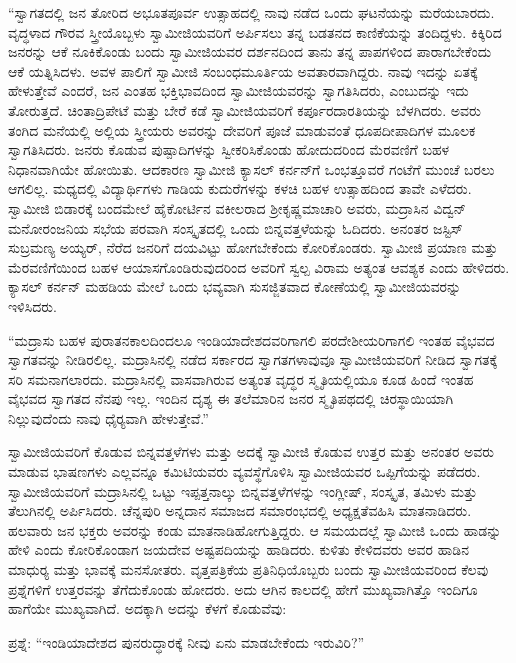  “ಸ್ವಾಗತದಲ್ಲಿ ಜನ ತೋರಿದ ಅಭೂತಪೂರ್ವ ಉತ್ಸಾಹದಲ್ಲಿ ನಾವು ನಡೆದ ಒಂದು ಘಟನೆಯನ್ನು ಮರೆಯಬಾರದು. ವೃದ್ಧಳಾದ ಗೌರವ ಸ್ತ್ರೀಯೊಬ್ಬಳು ಸ್ವಾಮೀಜಿಯವರಿಗೆ ಅರ್ಪಿಸಲು ತನ್ನ ಬಡತನದ ಕಾಣಿಕೆಯನ್ನು ತಂದಿದ್ದಳು. ಕಿಕ್ಕಿರಿದ ಜನರನ್ನು ಆಕೆ ನೂಕಿಕೊಂಡು ಬಂದು ಸ್ವಾಮೀಜಿಯವರ ದರ್ಶನದಿಂದ ತಾನು ತನ್ನ ಪಾಪಗಳಿಂದ ಪಾರಾಗಬೇಕೆಂದು ಆಕೆ ಯತ್ನಿಸಿದಳು. ಅವಳ ಪಾಲಿಗೆ ಸ್ವಾಮೀಜಿ ಸಂಬಂಧಮೂರ್ತಿಯ ಅವತಾರವಾಗಿದ್ದರು. ನಾವು ಇದನ್ನು ಏತಕ್ಕೆ ಹೇಳುತ್ತೇವೆ ಎಂದರೆ, ಜನ ಎಂತಹ ಭಕ್ತಿಭಾವದಿಂದ ಸ್ವಾಮೀಜಿಯವರನ್ನು ಸ್ವಾಗತಿಸಿದರು, ಎಂಬುದನ್ನು ಇದು ತೋರುತ್ತದೆ. ಚಿಂತಾದ್ರಿಪೇಟೆ ಮತ್ತು ಬೇರೆ ಕಡೆ ಸ್ವಾಮೀಜಿಯವರಿಗೆ ಕರ್ಪೂರದಾರತಿಯನ್ನು ಬೆಳಗಿದರು. ಅವರು ತಂಗಿದ ಮನೆಯಲ್ಲಿ ಅಲ್ಲಿಯ ಸ್ತ್ರೀಯರು ಅವರನ್ನು ದೇವರಿಗೆ ಪೂಜೆ ಮಾಡುವಂತೆ ಧೂಪದೀಪಾದಿಗಳ ಮೂಲಕ ಸ್ವಾಗತಿಸಿದರು. ಜನರು ಕೊಡುವ ಪುಷ್ಪಾದಿಗಳನ್ನು ಸ್ವೀಕರಿಸಿಕೊಂಡು ಹೋದುದರಿಂದ ಮೆರವಣಿಗೆ ಬಹಳ ನಿಧಾನವಾಗಿಯೇ ಹೋಯಿತು. ಆದಕಾರಣ ಸ್ವಾಮೀಜಿ ಕ್ಯಾಸಲ್ ಕರ್ನನ್‍ಗೆ ಒಂಭತ್ತೂವರೆ ಗಂಟೆಗೆ ಮುಂಚೆ ಬರಲು ಆಗಲಿಲ್ಲ. ಮಧ್ಯದಲ್ಲಿ ವಿದ್ಯಾರ್ಥಿಗಳು ಗಾಡಿಯ ಕುದುರೆಗಳನ್ನು ಕಳಚಿ ಬಹಳ ಉತ್ಸಾಹದಿಂದ ತಾವೇ ಎಳೆದರು. ಸ್ವಾಮೀಜಿ ಬಿಡಾರಕ್ಕೆ ಬಂದಮೇಲೆ ಹೈಕೋರ್ಟಿನ ವಕೀಲರಾದ ಶ‍್ರೀಕೃಷ್ಣಮಾಚಾರಿ ಅವರು, ಮದ್ರಾಸಿನ ವಿದ್ವನ್ ಮನೋರಂಜನಿಯ ಸಭೆಯ ಪರವಾಗಿ ಸಂಸ್ಕೃತದಲ್ಲಿ ಒಂದು ಬಿನ್ನವತ್ತಳೆಯನ್ನು ಓದಿದರು. ಅನಂತರ ಜಸ್ಟಿಸ್ ಸುಬ್ರಮಣ್ಯ ಅಯ್ಯರ್, ನೆರೆದ ಜನರಿಗೆ ದಯವಿಟ್ಟು ಹೋಗಬೇಕೆಂದು ಕೋರಿಕೊಂಡರು. ಸ್ವಾಮೀಜಿ ಪ್ರಯಾಣ ಮತ್ತು ಮೆರವಣಿಗೆಯಿಂದ ಬಹಳ ಆಯಾಸಗೊಂಡಿರುವುದರಿಂದ ಅವರಿಗೆ ಸ್ವಲ್ಪ ವಿರಾಮ ಅತ್ಯಂತ ಆವಶ್ಯಕ ಎಂದು ಹೇಳಿದರು. ಕ್ಯಾಸಲ್ ಕರ್ನನ್ ಮಹಡಿಯ ಮೇಲೆ ಒಂದು ಭವ್ಯವಾಗಿ ಸುಸಜ್ಜಿತವಾದ ಕೋಣೆಯಲ್ಲಿ ಸ್ವಾಮೀಜಿಯವರನ್ನು ಇಳಿಸಿದರು. 

 “ಮದ್ರಾಸು ಬಹಳ ಪುರಾತನಕಾಲದಿಂದಲೂ ಇಂಡಿಯಾದೇಶದವರಿಗಾಗಲಿ ಪರದೇಶೀಯರಿಗಾಗಲಿ ಇಂತಹ ವೈಭವದ ಸ್ವಾಗತವನ್ನು ನೀಡಿರಲಿಲ್ಲ. ಮದ್ರಾಸಿನಲ್ಲಿ ನಡೆದ ಸರ್ಕಾರದ ಸ್ವಾಗತಗಳಾವುವೂ ಸ್ವಾಮೀಜಿಯವರಿಗೆ ನೀಡಿದ ಸ್ವಾಗತಕ್ಕೆ ಸರಿ ಸಮನಾಗಲಾರದು. ಮದ್ರಾಸಿನಲ್ಲಿ ವಾಸವಾಗಿರುವ ಅತ್ಯಂತ ವೃದ್ಧರ ಸ್ಮೃತಿಯಲ್ಲಿಯೂ ಕೂಡ ಹಿಂದೆ ಇಂತಹ ವೈಭವದ ಸ್ವಾಗತದ ನೆನಪು ಇಲ್ಲ. ಇಂದಿನ ದೃಶ್ಯ ಈ ತಲೆಮಾರಿನ ಜನರ ಸ್ಮೃತಿಪಥದಲ್ಲಿ ಚಿರಸ್ಥಾಯಿಯಾಗಿ ನಿಲ್ಲುವುದೆಂದು ನಾವು ಧೈರ‍್ಯವಾಗಿ ಹೇಳುತ್ತೇವೆ.” 

 ಸ್ವಾಮೀಜಿಯವರಿಗೆ ಕೊಡುವ ಬಿನ್ನವತ್ತಳೆಗಳು ಮತ್ತು ಅದಕ್ಕೆ ಸ್ವಾಮೀಜಿ ಕೊಡುವ ಉತ್ತರ ಮತ್ತು ಅನಂತರ ಅವರು ಮಾಡುವ ಭಾಷಣಗಳು ಎಲ್ಲವನ್ನೂ ಕಮಿಟಿಯವರು ವ್ಯವಸ್ಥೆಗೊಳಿಸಿ ಸ್ವಾಮೀಜಿಯವರ ಒಪ್ಪಿಗೆಯನ್ನು ಪಡೆದರು. ಸ್ವಾಮೀಜಿಯವರಿಗೆ ಮದ್ರಾಸಿನಲ್ಲಿ ಒಟ್ಟು ಇಪ್ಪತ್ತನಾಲ್ಕು ಬಿನ್ನವತ್ತಳೆಗಳನ್ನು ಇಂಗ್ಲೀಷ್, ಸಂಸ್ಕೃತ, ತಮಿಳು ಮತ್ತು ತೆಲುಗಿನಲ್ಲಿ ಅರ್ಪಿಸಿದರು. ಚೆನ್ನಪುರಿ ಅನ್ನದಾನ ಸಮಾಜದ ಸಮಾರಂಭದಲ್ಲಿ ಅಧ್ಯಕ್ಷತೆವಹಿಸಿ ಮಾತನಾಡಿದರು. ಹಲವಾರು ಜನ ಭಕ್ತರು ಅವರನ್ನು ಕಂಡು ಮಾತನಾಡಿಹೋಗುತ್ತಿದ್ದರು. ಆ ಸಮಯದಲ್ಲೆ ಸ್ವಾಮೀಜಿ ಒಂದು ಹಾಡನ್ನು ಹೇಳಿ ಎಂದು ಕೋರಿಕೊಂಡಾಗ ಜಯದೇವ ಅಷ್ಟಪದಿಯನ್ನು ಹಾಡಿದರು. ಕುಳಿತು ಕೇಳಿದವರು ಅವರ ಹಾಡಿನ ಮಾಧುರ‍್ಯ ಮತ್ತು ಭಾವಕ್ಕೆ ಮನಸೋತರು. ವೃತ್ತಪತ್ರಿಕೆಯ ಪ್ರತಿನಿಧಿಯೊಬ್ಬರು ಬಂದು ಸ್ವಾಮೀಜಿಯವರಿಂದ ಕೆಲವು ಪ್ರಶ್ನೆಗಳಿಗೆ ಉತ್ತರವನ್ನು ತೆಗೆದುಕೊಂಡು ಹೋದರು. ಅದು ಆಗಿನ ಕಾಲದಲ್ಲಿ ಹೇಗೆ ಮುಖ್ಯವಾಗಿತ್ತೊ ಇಂದಿಗೂ ಹಾಗೆಯೇ ಮುಖ್ಯವಾಗಿದೆ. ಅದಕ್ಕಾಗಿ ಅದನ್ನು ಕೆಳಗೆ ಕೊಡುವೆವು: 

 ಪ್ರಶ್ನೆ: “ಇಂಡಿಯಾದೇಶದ ಪುನರುದ್ಧಾರಕ್ಕೆ ನೀವು ಏನು ಮಾಡಬೇಕೆಂದು ಇರುವಿರಿ?” 

